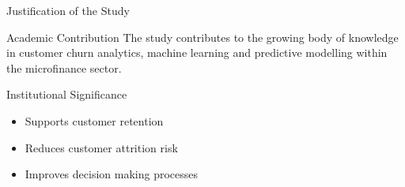\documentclass[10pt]{beamer}
\begin{document}
	
\begin{frame}{Justification of the Study}
	
	\small
	
	\begin{block}{Academic Contribution}
		The study contributes to the growing body of knowledge in customer churn analytics, machine learning and predictive modelling within the microfinance sector.
	\end{block}
	
	\vspace{0.3cm}
	

		
		\begin{exampleblock}{Institutional Significance}
			\begin{itemize}
				\item Supports customer retention
				
				\item Reduces customer attrition risk
				
				\item Improves decision making processes
			\end{itemize}
		\end{exampleblock}
		

	
\end{frame}
	
\end{document}

